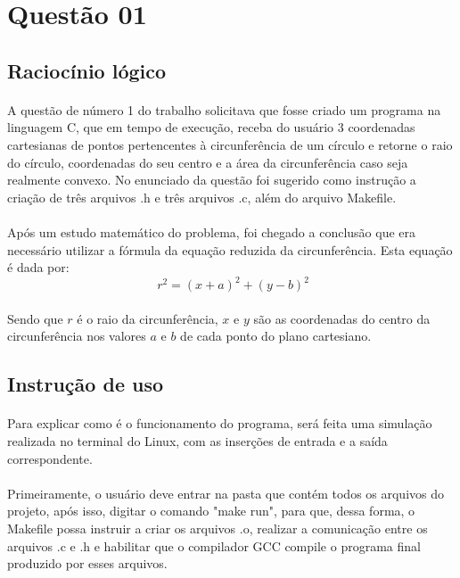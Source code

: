 \documentclass[a4paper, 12pt]{article}
\begin{document}
\section{Quest\~ao 01}
	\subsection{Racioc\'inio l\'ogico}
    	\paragraph{}	A quest\~ao de n\'umero 1 do trabalho solicitava que fosse criado um programa na linguagem C, que em tempo de execu\c{c}\~ao, receba do usu\'ario 3 coordenadas cartesianas de pontos pertencentes \`a circunfer\^encia de um c\'irculo e retorne o raio do c\'irculo, coordenadas do seu centro e a área da circunferência caso seja realmente convexo. No enunciado da quest\~ao foi sugerido como instrução a cria\c{c}\~ao de tr\^es arquivos .h e tr\^es arquivos .c, al\'em do arquivo Makefile.
        \paragraph{}	Ap\'os um estudo matem\'atico do problema, foi chegado a conclus\~ao que era necess\'ario utilizar a f\'ormula da equa\c{c}\~ao reduzida da circunfer\^encia. Esta equa\c{c}\~ao \'e dada por:
         $$\ r^{2} = (x+a)^{2} + (y-b)^{2} $$
        \paragraph{}	Sendo que $r$ \'e o raio da circunfer\^encia, $x$ e $y$ s\~ao as coordenadas do centro da circunfer\^encia nos valores $a$ e $b$ de cada ponto do plano cartesiano. 	\subsection{Instru\c{c}\~ao de uso}
   		\paragraph{}	Para explicar como \'e o funcionamento do programa, ser\'a feita uma simula\c{c}\~ao realizada no terminal do Linux, com as inser\c{c}\~oes de entrada e a sa\'ida correspondente.
        \paragraph{}	Primeiramente, o usu\'ario deve entrar na pasta que cont\'em todos os arquivos do projeto, ap\'os isso, digitar o comando "make run", para que, dessa forma, o Makefile possa instruir a criar os arquivos .o, realizar a comunica\c{c}\~ao entre os arquivos .c e .h e habilitar que o compilador GCC compile o programa final produzido por esses arquivos.
\end{document}
